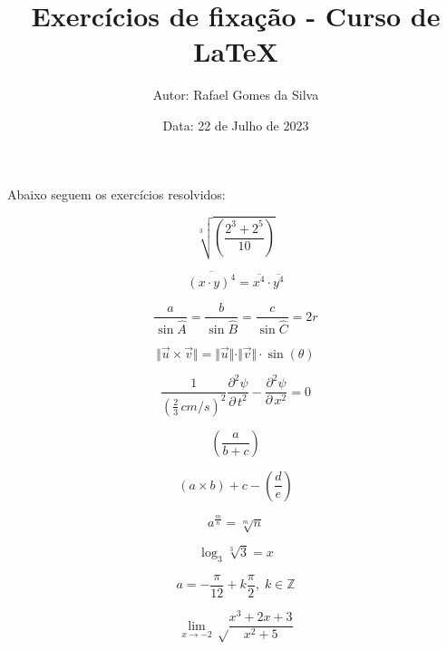 \documentclass[12pt]{article}
\title{\textbf{Exercícios de fixação - Curso de LaTeX}}
\author{Autor: Rafael Gomes da Silva}
\date{Data: 22 de Julho de 2023}
\begin{document}
\maketitle

Abaixo seguem os exercícios resolvidos:

\begin{equation}
	\sqrt[3]{\left(\frac{2^{3}+2^{5}}{10}\right)}
\end{equation}

\begin{equation}
	\overline{(x \cdot y)^{4}} = \overline{x^{4}} \cdot \overline{y^{4}}
\end{equation}

\begin{equation}
	\frac{a}{\sin \widehat{A}} = \frac{b}{\sin \widehat{B}} = \frac{c}{\sin \widehat{C}} = 2r
\end{equation}

\begin{equation}
	\Vert \vec{u} \times \vec{v} \Vert= \Vert \vec{u} \Vert \cdot \Vert \vec{v} \Vert \cdot \sin(\theta)
\end{equation}
   
\begin{equation}
	\frac{1}{\left(\frac{2}{3} \, cm/s \right)^2} \frac{\partial^{2}\psi}{\partial \, t^2} - \frac{\partial^{2}\psi}{\partial \, x^2} = 0
\end{equation}
   
\begin{equation}
	\left(\frac{a}{b+c}\right)
\end{equation}
 
\begin{equation}
	\left(a \times b \right) + c - \left(\frac{d}{e}\right)
\end{equation}
 
\begin{equation}
	a^{\frac{m}{n}} = \sqrt[m]{n}
\end{equation}
 
\begin{equation}
	\log_3{\sqrt[3]{3}} = x
\end{equation}
 
\begin{equation}
	a = - \frac{\pi}{12} + k\frac{\pi}{2}, \; k \in \mathbb{Z}
\end{equation}

\begin{equation}
	\lim_{x \rightarrow -2} \sqrt \frac{x^{3}+2x+3}{x^{2}+5}
\end{equation}
\end{document}
